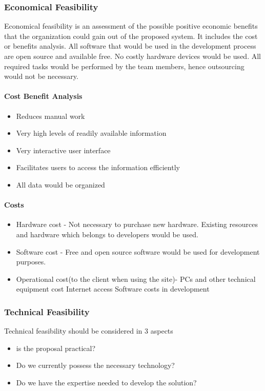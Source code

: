 \documentclass[a4paper,beamer]{article}
\begin{document}
	\subsubsection{Economical Feasibility}
	Economical feasibility is an assessment of the possible positive economic benefits that the organization could gain out of the proposed system. It includes the cost or benefits analysis. All software that would be used in the development process are open source and available free. No costly hardware devices would be used. All required tasks would be performed by the team members, hence outsourcing would not be necessary.
	
	\paragraph{\textbf{Cost Benefit Analysis}}
	\begin{itemize}
		\item Reduces manual work
		\item Very high levels of readily available information
		\item Very interactive user interface
		\item Facilitates users to access the information efficiently
		\item All data would be organized
	\end{itemize}
	
	\paragraph{\textbf{Costs}}
	\begin{itemize}
		\item Hardware cost -
		Not necessary to purchase new hardware. Existing resources and hardware which belongs to developers would be used.
		\item Software cost - 
		Free and open source software would be used for development purposes.
		\item Operational cost(to the client when using the site)-
		PCs and other technical equipment cost
		Internet access
		Software costs in development
	\end{itemize}
	
	\subsubsection{Technical Feasibility}
	Technical feasibility should be considered in 3 aspects
	\begin{itemize}
		\item is the proposal practical?
		\item Do we currently possess the necessary technology?
		\item Do we have the expertise needed to develop the solution?
	\end{itemize}
	
\end{document}
